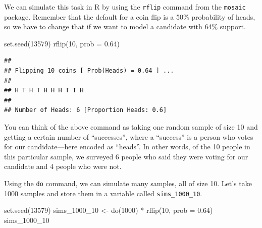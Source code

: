 \documentclass[
]{book}
\newenvironment{Shaded}{\begin{snugshade}}{\end{snugshade}}
\newcommand{\AttributeTok}[1]{\textcolor[rgb]{0.77,0.63,0.00}{#1}}
\newcommand{\DecValTok}[1]{\textcolor[rgb]{0.00,0.00,0.81}{#1}}
\newcommand{\FloatTok}[1]{\textcolor[rgb]{0.00,0.00,0.81}{#1}}
\newcommand{\FunctionTok}[1]{\textcolor[rgb]{0.00,0.00,0.00}{#1}}
\newcommand{\NormalTok}[1]{#1}
\newcommand{\OtherTok}[1]{\textcolor[rgb]{0.56,0.35,0.01}{#1}}
\newcommand{\SpecialCharTok}[1]{\textcolor[rgb]{0.00,0.00,0.00}{#1}}
\begin{document}
We can simulate this task in R by using the \texttt{rflip} command from the \texttt{mosaic} package. Remember that the default for a coin flip is a 50\% probability of heads, so we have to change that if we want to model a candidate with 64\% support.

\begin{Shaded}
\begin{Highlighting}[]
\FunctionTok{set.seed}\NormalTok{(}\DecValTok{13579}\NormalTok{)}
\FunctionTok{rflip}\NormalTok{(}\DecValTok{10}\NormalTok{, }\AttributeTok{prob =} \FloatTok{0.64}\NormalTok{)}
\end{Highlighting}
\end{Shaded}

\begin{verbatim}
## 
## Flipping 10 coins [ Prob(Heads) = 0.64 ] ...
## 
## H T H T H H H T T H
## 
## Number of Heads: 6 [Proportion Heads: 0.6]
\end{verbatim}

You can think of the above command as taking one random sample of size 10 and getting a certain number of ``successes'', where a ``success'' is a person who votes for our candidate---here encoded as ``heads''. In other words, of the 10 people in this particular sample, we surveyed 6 people who said they were voting for our candidate and 4 people who were not.

Using the \texttt{do} command, we can simulate many samples, all of size 10. Let's take 1000 samples and store them in a variable called \texttt{sims\_1000\_10}.

\begin{Shaded}
\begin{Highlighting}[]
\FunctionTok{set.seed}\NormalTok{(}\DecValTok{13579}\NormalTok{)}
\NormalTok{sims\_1000\_10 }\OtherTok{\textless{}{-}} \FunctionTok{do}\NormalTok{(}\DecValTok{1000}\NormalTok{) }\SpecialCharTok{*} \FunctionTok{rflip}\NormalTok{(}\DecValTok{10}\NormalTok{, }\AttributeTok{prob =} \FloatTok{0.64}\NormalTok{)}
\NormalTok{sims\_1000\_10}
\end{Highlighting}
\end{Shaded}
\end{document}
